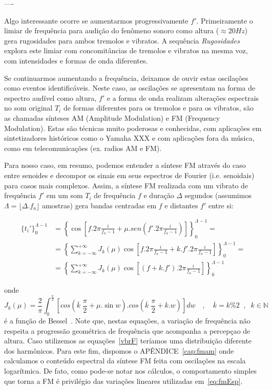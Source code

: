 ----

Algo interessante ocorre se aumentarmos progressivamente $f'$.
Primeiramente o limiar de frequência
para audição do fenômeno sonoro como
altura ($\approx 20Hz$) gera rugosidades para
ambos tremolos e vibratos. A sequência \emph{Rugosidades}
explora este limiar com concomitâncias de tremolos e vibratos na mesma
voz, com intensidades e formas de onda diferentes.

Se continuarmos aumentando a frequência, deixamos de ouvir estas oscilações
como eventos identificáveis. Neste caso, as oscilações se apresentam na forma de espectro
audível como altura, $f'$ e a forma de onda realizam alterações espectrais no som
original $T_i$ de formas diferentes para os tremolos e para os vibratos, são as 
chamadas sínteses AM (Amplitude Modulation) e FM (Frequency Modulation).
Estas são técnicas muito poderosas e conhecidas, com aplicações em sintetizadores
históricos como o Yamaha XXX e com aplicações fora da música, como em telecomunicações
(ex. radios AM e FM).

Para nosso caso, em resumo, podemos entender a síntese FM através do caso entre senoides
e decompor os sinais em seus espectros de Fourier (i.e. senoidais) para casos mais complexos.
Assim, a síntese FM realizada com um vibrato de frequência $f'$ em um som $T_i$ de frequência $f$
e duração $\Delta$ segundos (assumimos $\Lambda = \lfloor \Delta . f_a \rfloor $ amostras)
gera bandas centradas em $f$ e distantes $f'$ entre si:

\begin{equation}\label{eq:fmEsp}
\begin{split}
\{t_i'\}_0^{\Lambda -1} & = \left \{ \cos \left [f . 2 \pi \frac{i}{f_a-1} + \mu . sen \left ( f' . 2 \pi \frac{i}{ f_a -1 } \right ) \right ] \right \}_0^{\Lambda-1}  = \\
 & = \left \{ \sum_{k=-\infty}^{+\infty} J_k(\mu) \cos \left [ f . 2 \pi \frac{i}{f_a-1} + k . f' . 2 \pi \frac{i}{f_a-1} \right ]  \right \}_0^{\Lambda-1} = \\
 & = \left \{ \sum_{k=-\infty}^{+\infty} J_k(\mu) \cos \left [ (f+k.f') . 2 \pi \frac{i}{f_a-1} \right ]  \right \}_0^{\Lambda-1}
\end{split}
\end{equation}

onde 
\begin{equation}
J_k(\mu) = \frac{2}{\pi} \int_0^{\frac{\pi}{2}}\left [ cos \left (\overline{k}\;\frac{\pi}{2} + \mu . \sin w \right ) . cos \left ( \overline{k}\;\frac{\pi}{2} + k . w \right ) \right ] dw \quad , \quad \overline{k} = k \% 2 \;\;,\;\; k \in \mathbb{N}
\end{equation}
é a função de Bessel~\cite{BesselCCRMA,JOSFM}. Note que, nestas equações, a variação de frequência não respeita a progressão geométrica de frequência que acompanha a percepçao de altura. Caso utilizemos as equações~\ref{vbrF} teríamos uma distribuição diferente dos harmônicos. Para este fim, dispomos o APÊNDICE~\ref{cap:fmam} onde calculamos o conteúdo espectral da síntese FM feita com oscilações na escala logarítmica. De fato, como pode-se notar nos cálculos, o comportamento simples que torna a FM é privilégio das variações lineares utilizadas em~\ref{eq:fmEsp}.

